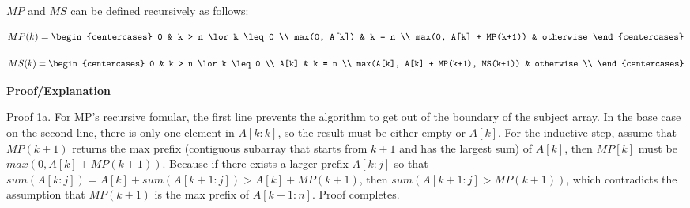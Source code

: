 \documentclass[12pt,article]{article}
\begin{document}
$MP$ and $MS$ can be defined recursively as follows:


\small{
    \[
        MP(k)=
        \begin{centercases}
            0                          & k > n \lor k \leq 0 \\
            max(0, A[k])               & k = n \\
            max(0, A[k] + MP(k+1))        & otherwise
        \end{centercases}
        \]
}

\small{
    \[
        MS(k)=
        \begin{centercases}
            0                  & k > n \lor k \leq 0 \\
            A[k]               & k = n \\
            max(A[k], A[k] + MP(k+1), MS(k+1))     & otherwise \\
        \end{centercases}
        \]
}

\normalsize{}

\textbf{Proof/Explanation}

Proof 1a. For MP's recursive fomular, the first line prevents the algorithm to get out of the boundary of the subject array. In the base case on the second line, there is only one element in $A[k:k]$, so the result must be either empty or $A[k]$. For the inductive step, assume that $MP(k+1)$ returns the max prefix (contiguous subarray that starts from $k+1$ and has the largest sum) of $A[k]$, then $MP[k]$ must be $max(0, A[k] + MP(k+1))$. Because if there exists a larger prefix $A[k:j]$ so that $sum(A[k:j]) = A[k] + sum(A[k+1:j]) > A[k] + MP(k+1)$, then $sum(A[k+1:j] > MP(k+1))$, which contradicts the assumption that $MP(k+1)$ is the max prefix of $A[k+1:n]$. Proof completes.
\end{document}
